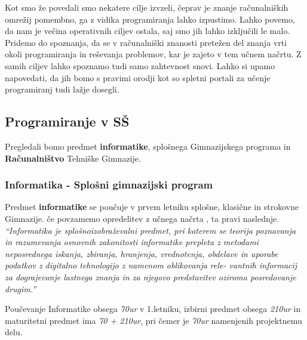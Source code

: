 Kot smo že povedali smo nekatere cilje izvzeli, čeprav je znanje
računalniških omrežij pomembno, ga z vidika programiranja lahko
izpustimo. Lahko povemo, da nam je večina operativnih ciljev ostala,
saj smo jih lahko izključili le malo. Pridemo do spoznanja, da se v
računalniški znanosti pretežen del znanja vrti okoli programiranja in
reševanja problemov, kar je zajeto v tem učnem načrtu. Z samih ciljev
lahko spoznamo tudi samo zahtevnost snovi. Lahko si upamo napovedati,
da jih bomo s pravimi orodji kot so spletni portali za učenje
programiranj tudi lažje dosegli.

\subsection{Programiranje v SŠ}
\label{sec:Programiranje_v_SŠ}



Pregledali bomo predmet \textbf{informatike}, splošnega Gimnazijskega
programa in \textbf{Računalništvo} Tehniške Gimnazije.

\subsubsection{Informatika - Splošni gimnazijski program}
\label{sec:informatika_splošni_gim_program}

Predmet \textbf{informatike} se poučuje v prvem letniku splošne,
klasične in strokovne Gimnazije. če povzamemo opredelitev z učnega
načrta \cite{ucni_nacrt-informatika-gim}, ta pravi
naslednje. \emph{``Informatika je splošnoizobraževalni predmet, pri
  katerem se teorija poznavanja in razumevanja osnovnih zakonitosti
  informatike prepleta z metodami neposrednega iskanja, zbiranja,
  hranjenja, vrednotenja, obdelave in uporabe podatkov z digitalno
  tehnologijo z namenom oblikovanja rele- vantnih informacij za
  dograjevanje lastnega znanja in za njegovo predstavitev oziroma
  posredovanje drugim.''}

Poučevanje Informatike obsega \emph{70ur} v 1.letniku, izbirni predmet
obsega \emph{210ur} in maturitetni predmet ima \emph{70 + 210ur}, pri
čemer je \emph{70ur} namenjenih projektnemu delu.

